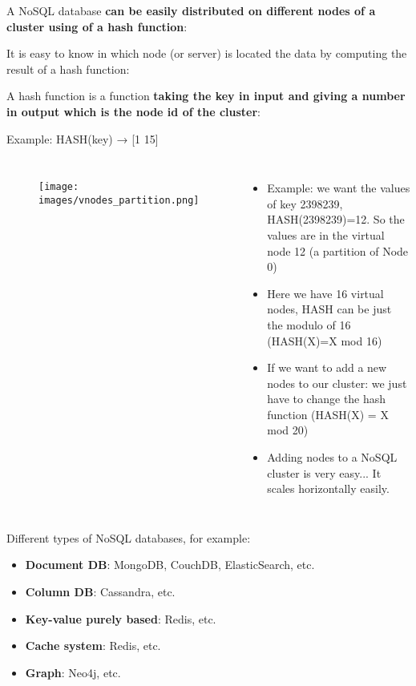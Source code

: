 \documentclass{beamer}[10pt, usepdftitle=false handout]
\begin{document}
	\begin{frame}
	
	A NoSQL database \textbf{can be easily distributed on different nodes of a cluster using of a hash function}:	
	\vspace*{0.6em}

	It is easy to know in which node (or server) is located the data by computing the result of a hash function:
	\vspace*{0.6em}
	
	A hash function is a function \textbf{taking the key in input and giving a number in output which is the node id of the cluster}:	
	\vspace*{0.6em}
	
	Example: HASH(key) → [1 15]
	
	\end{frame}
	\begin{frame}


	\begin{columns}[c]
	\column{.4\textwidth}
	\begin{figure}
	\texttt{[image: images/vnodes\_partition.png]} 
	\end{figure}	

	\column{.6\textwidth}
	\begin{itemize}
	\item{Example: we want the values of key 2398239, HASH(2398239)=12. So the values are in the virtual node 12 (a partition of Node 0)}
	\item{Here we have 16 virtual nodes, HASH can be just the modulo of 16 (HASH(X)=X mod 16)}
	\item{If we want to add a new nodes to our cluster: we just have to change the hash function (HASH(X) = X mod 20)}
	\item{Adding nodes to a NoSQL cluster is very easy... It scales horizontally easily.}
	\end{itemize}	
	\end{columns}
	
	\end{frame}	
	
	\begin{frame}

Different types of NoSQL databases, for example:
\vspace*{0.6em}

\begin{itemize}
\item{\textbf{Document DB}: MongoDB, CouchDB, ElasticSearch, etc.}
\item{\textbf{Column DB}: Cassandra, etc.}
\item{\textbf{Key-value purely based}: Redis, etc.}
\item{\textbf{Cache system}: Redis, etc.}
\item{\textbf{Graph}: Neo4j, etc.}
\end{itemize}

	
	\end{frame}	
	
\end{document}
